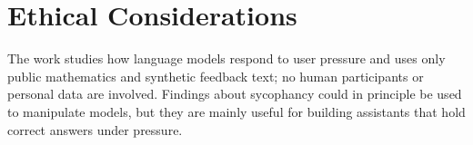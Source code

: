 \section*{Ethical Considerations}
\label{app:ethics}
The work studies how language models respond to user pressure and uses only public mathematics and synthetic feedback text; no human participants or personal data are involved.
Findings about sycophancy could in principle be used to manipulate models, but they are mainly useful for building assistants that hold correct answers under pressure.
